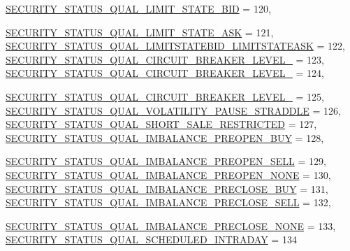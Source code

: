\begin{CompactItemize}
\hyperlink{namespaceWombat_2de6f22c731ba94169dc24b8054862b85cdc47e0439257760e7356b4aded7759}{SECURITY\_\-STATUS\_\-QUAL\_\-LIMIT\_\-STATE\_\-BID} =  120, 
\par
\hyperlink{namespaceWombat_2de6f22c731ba94169dc24b8054862b85821c8a934c4d7b81d0be4c10be3b862}{SECURITY\_\-STATUS\_\-QUAL\_\-LIMIT\_\-STATE\_\-ASK} =  121, 
\hyperlink{namespaceWombat_2de6f22c731ba94169dc24b8054862b80002d63b413c0f836da6c8e78b018b19}{SECURITY\_\-STATUS\_\-QUAL\_\-LIMITSTATEBID\_\-LIMITSTATEASK} =  122, 
\hyperlink{namespaceWombat_2de6f22c731ba94169dc24b8054862b83ea3de61c98fec163a68da0e83a9801a}{SECURITY\_\-STATUS\_\-QUAL\_\-CIRCUIT\_\-BREAKER\_\-LEVEL\_} =  123, 
\hyperlink{namespaceWombat_2de6f22c731ba94169dc24b8054862b8e832e300d7fefd5334fc54e9d276a6e3}{SECURITY\_\-STATUS\_\-QUAL\_\-CIRCUIT\_\-BREAKER\_\-LEVEL\_} =  124, 
\par
\hyperlink{namespaceWombat_2de6f22c731ba94169dc24b8054862b86a7eee77e974df32cde1a5517c323781}{SECURITY\_\-STATUS\_\-QUAL\_\-CIRCUIT\_\-BREAKER\_\-LEVEL\_} =  125, 
\hyperlink{namespaceWombat_2de6f22c731ba94169dc24b8054862b82d397c8fc41f5147bdb651a4f40617c2}{SECURITY\_\-STATUS\_\-QUAL\_\-VOLATILITY\_\-PAUSE\_\-STRADDLE} =  126, 
\hyperlink{namespaceWombat_2de6f22c731ba94169dc24b8054862b80f0136417dcf2d8b8765b36f1405f69a}{SECURITY\_\-STATUS\_\-QUAL\_\-SHORT\_\-SALE\_\-RESTRICTED} =  127, 
\hyperlink{namespaceWombat_2de6f22c731ba94169dc24b8054862b8437873f91c09a353d1d8c4997917331a}{SECURITY\_\-STATUS\_\-QUAL\_\-IMBALANCE\_\-PREOPEN\_\-BUY} =  128, 
\par
\hyperlink{namespaceWombat_2de6f22c731ba94169dc24b8054862b83df62cd2b055c09c4fdff1fedfbd5f89}{SECURITY\_\-STATUS\_\-QUAL\_\-IMBALANCE\_\-PREOPEN\_\-SELL} =  129, 
\hyperlink{namespaceWombat_2de6f22c731ba94169dc24b8054862b85cb767fb21b250d6c7ec0dea91909aba}{SECURITY\_\-STATUS\_\-QUAL\_\-IMBALANCE\_\-PREOPEN\_\-NONE} =  130, 
\hyperlink{namespaceWombat_2de6f22c731ba94169dc24b8054862b89c4bff85b26b03014cb8d1b73f65bc7e}{SECURITY\_\-STATUS\_\-QUAL\_\-IMBALANCE\_\-PRECLOSE\_\-BUY} =  131, 
\hyperlink{namespaceWombat_2de6f22c731ba94169dc24b8054862b8c106cd406fb84634cece6735b089a15a}{SECURITY\_\-STATUS\_\-QUAL\_\-IMBALANCE\_\-PRECLOSE\_\-SELL} =  132, 
\par
\hyperlink{namespaceWombat_2de6f22c731ba94169dc24b8054862b82b9bdc7ad371aed53a229b4602b044ee}{SECURITY\_\-STATUS\_\-QUAL\_\-IMBALANCE\_\-PRECLOSE\_\-NONE} =  133, 
\hyperlink{namespaceWombat_2de6f22c731ba94169dc24b8054862b8a7bd562b5869fc6ad9d9eaf25937e59f}{SECURITY\_\-STATUS\_\-QUAL\_\-SCHEDULED\_\-INTRADAY} =  134

\end{CompactItemize}
